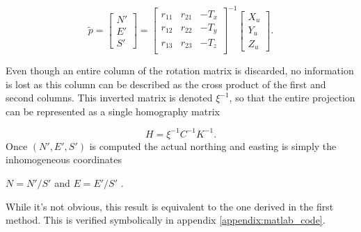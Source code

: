   \[
    \tilde{p} =
    \begin{bmatrix} N' \\ E' \\ S' \end{bmatrix}
      = 
    \begin{bmatrix} r_{11} & r_{21} & -T_x \\
                    r_{12} & r_{22} & -T_y \\
                    r_{13} & r_{23} & -T_z \\
    \end{bmatrix}^{-1}
    \begin{bmatrix} X_u \\ Y_u \\ Z_u \end{bmatrix}
  .
  \]
 
  Even though an entire column of the rotation matrix is discarded, no information is lost as this column can be described as the cross product of the first and second columns.  This inverted matrix is denoted $\xi^{-1}$, so that the entire projection can be represented as a single homography matrix
  
 \begin{equation}
 H = \xi^{-1} C^{-1} K^{-1} 
 .
 \label{equation:homography}
 \end{equation}
 Once $(N',E',S')$ is computed the actual northing and easting is simply the inhomogeneous coordinates

 \begin{center}
 $N=N'/S'$ and $E=E'/S'$
 .
 \end{center}
 
 While it's not obvious, this result is equivalent to the one derived in the first method.  This is verified symbolically in appendix \ref{appendix:matlab_code}. 

